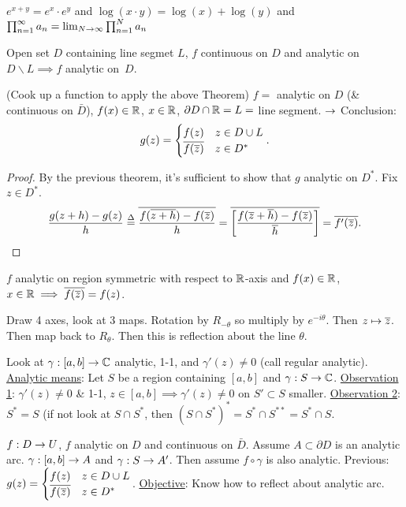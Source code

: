 \documentclass[]{article}
\begin{document}
\begin{example}
	$e^{x+y} = e^x \cdot e^y$ and $\log{(x\cdot y)} = \log{(x)} + \log{(y)}$ and $\prod_{n=1}^\infty a_n = \lim_{N\rightarrow\infty} \prod_{n=1}^N a_n$
\end{example}
\begin{recall}
	Open set $D$ containing line segmet $L$, $f$ continuous on $D$ and analytic on $D\backslash L \implies f$ analytic on~$D$.
\end{recall}
\begin{theorem}
	 (Cook up a function to apply the above Theorem) $f = $ analytic on $D$ (\& continuous on $\bar{D}$), $f(x) \in \mathbb{R}$, $x\in\mathbb{R}$, $\partial D \cap \mathbb{R} = L = $ line segment. $\rightarrow$ Conclusion: $$g(z) = \begin{cases} f(z) & z\in D\cup L \\ \overline{f(\overline{z})} & z\in D^* \end{cases}.$$
\end{theorem}
\begin{proof}
	By the previous theorem, it's sufficient to show that $g$ analytic on $D^*$. Fix $z\in D^*$. $$\frac{g(z+h)-g(z)}{h} \overset{\Delta}{=} \overline{\frac{f(\overline{z+h}) - f(\overline{z})}{h}} = \overline{ \left[ \frac{ f(\overline{z}+\overline{h}) - f(\overline{z})}{\overline{h}} \right] } = \overline{ f'(\overline{z})}.$$
\end{proof}
\begin{corollary}
	$f$ analytic on region symmetric with respect to $\mathbb{R}$-axis and $f(x)\in\mathbb{R}$, $x\in\mathbb{R} \implies \overline{f(\overline{z})} = f(z)$.
\end{corollary}

\begin{example}
	 Draw 4 axes, look at 3 maps. Rotation by $R_{-\theta}$ so multiply by $e^{-i\theta}$. Then $z\mapsto \overline{z}$. Then map back to $R_{\theta}$. Then this is reflection about the line $\theta$.
\end{example}

Look at $\gamma :[a,b] \rightarrow \mathbb{C}$ analytic, 1-1, and $\gamma'(z)\neq 0$ (call regular analytic).
\underline{Analytic means}: Let $S$ be a region containing $[a,b]$ and $\gamma: S\rightarrow \mathbb{C}$.
\underline{Observation 1}: $\gamma'(z) \neq 0$ \& 1-1, $z\in[a,b] \implies \gamma'(z) \neq 0 $ on $S' \subset S$ smaller.
\underline{Observation 2}: $S^* = S$ (if not look at $S\cap S^*$, then $(S\cap S^*)^* = S^* \cap S^{**} = S^*\cap S$.

\begin{example}
	$f:D\rightarrow U$, $f$ analytic on $D$ and continuous on $\bar{D}$. Assume $A\subset \partial D$ is an analytic arc. $\gamma : [a,b] \rightarrow A$ and $\gamma : S \rightarrow A'$. Then assume $f\circ \gamma$ is also analytic.
	Previous: $g(z) = \begin{cases} f(z) & z\in D\cup L \\ \overline{f{(\overline{z})}} & z\in D^* \end{cases}$.
	\underline{Objective}: Know how to reflect about analytic arc.
\end{example}
\end{document}
